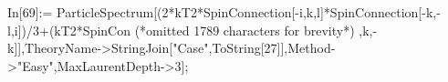 In[69]:= ParticleSpectrum[(2*kT2*SpinConnection[-i,k,l]*SpinConnection[-k,-l,i])/3+(kT2*SpinCon (*omitted 1789 characters for brevity*) ,k,-k]],TheoryName->StringJoin["Case",ToString[27]],Method->"Easy",MaxLaurentDepth->3];